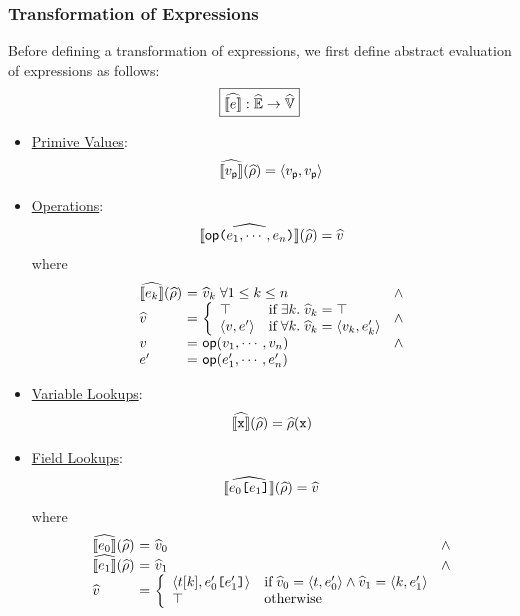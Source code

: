 \subsubsection{Transformation of Expressions} Before defining a transformation of
expressions, we first define abstract evaluation of expressions as follows:
\[
  \framebox{$\asem{\expr}: \aenvset \rightarrow \avalset$}
\]
\begin{itemize}
  \item \underline{Primive Values}:
    \[
      \widehat{\llbracket{v_{\textsf{p}}}\rrbracket}(\widehat{\rho}) = \langle v_{\textsf{p}}, v_{\textsf{p}} \rangle
    \]
  \item \underline{Operations}:
    \[
      \widehat{\llbracket{\textsf{op}\texttt{(}e_1, \cdots, e_n \texttt{)}}\rrbracket}(\widehat{\rho}) = \widehat{v}
    \]
    where
    \[
      \begin{array}{l@{~}c@{~}l@{~}l}
        \asem{\expr_k}(\aenv) &=& \aval_k \; \forall 1 \leq k \leq n
        &\wedge\\
        \aval &=& \left\{
          \begin{array}{ll}
            \top & \text{if} \; \exists k. \; \aval_k = \top\\
            \langle \val, \expr' \rangle & \text{if} \; \forall k. \; \aval_k =
            \langle \val_k, \expr'_k \rangle\\
          \end{array}
        \right. &\wedge\\
        \val &=& \op(\val_1, \cdots, \val_n) &\wedge\\
        \expr' &=& \op(\expr'_1, \cdots, \expr'_n)\\
      \end{array}
    \]
  \item \underline{Variable Lookups}:
    \[
      \widehat{\llbracket{\texttt{x}}\rrbracket}(\widehat{\rho}) = \widehat{\rho}(\texttt{x})
    \]
  \item \underline{Field Lookups}:
    \[
      \widehat{\llbracket{e_0 \texttt{[}e_1 \texttt{]}}\rrbracket}(\widehat{\rho}) = \widehat{v}
    \]
    where
    \[
      \begin{array}{l@{~}c@{~}l@{~}l}
        \asem{\expr_0}(\aenv) &=& \aval_0 &\wedge\\
        \asem{\expr_1}(\aenv) &=& \aval_1 &\wedge\\
        \aval &=& \left\{
          \begin{array}{ll}
            \langle \tree[k], \expr'_0 \kwsl \expr'_1 \kwsr \rangle & \text{if}
            \; \aval_0 = \langle \tree, \expr'_0 \rangle \wedge \aval_1 =
            \langle k, \expr'_1 \rangle\\
            \top & \text{otherwise}\\
          \end{array}
        \right.\\
      \end{array}
    \]
\end{itemize}
